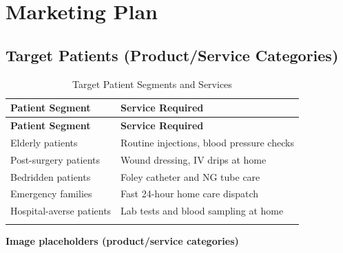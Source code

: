\documentclass[12pt, a4paper]{article}
\begin{document}
\newpage

\section{Marketing Plan}

\subsection{Target Patients (Product/Service Categories)}

\begin{longtable}{@{} L{5cm} L{9.4cm} @{}}
\toprule
\textbf{Patient Segment} & \textbf{Service Required} \\
\midrule
\endfirsthead
\toprule
\textbf{Patient Segment} & \textbf{Service Required} \\
\midrule
\endhead
Elderly patients & Routine injections, blood pressure checks \\[4pt]
Post-surgery patients & Wound dressing, IV drips at home \\[4pt]
Bedridden patients & Foley catheter and NG tube care \\[4pt]
Emergency families & Fast 24-hour home care dispatch \\[4pt]
Hospital-averse patients & Lab tests and blood sampling at home \\
\bottomrule
\caption{Target Patient Segments and Services}
\end{longtable}

\noindent\textbf{Image placeholders (product/service categories)}\\[6pt]
\\[8pt]
\\[8pt]
\\[8pt]
\\[8pt]
\end{document}
